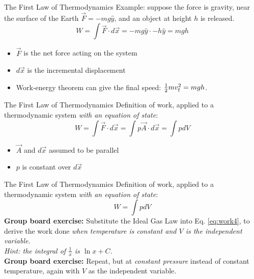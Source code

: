 \documentclass{beamer}
\begin{document}
\begin{frame}{The First Law of Thermodynamics}
Example: suppose the force is gravity, near the surface of the Earth $\vec{F} = -mg \hat{y}$, and an object at height $h$ is released.
\begin{equation}
W = \int \vec{F} \cdot d\vec{x} = -mg \hat{y} \cdot -h\hat{y} = mgh
\label{eq:work2}
\end{equation}
\begin{itemize}
\item $\vec{F}$ is the net force acting on the system
\item $d\vec{x}$ is the incremental displacement
\item Work-energy theorem can give the final speed: $\frac{1}{2}mv_{\rm f}^2 = mgh$.
\end{itemize}
\end{frame}

\begin{frame}{The First Law of Thermodynamics}
Definition of work, applied to a thermodynamic system \textit{with an equation of state}:
\begin{equation}
W = \int \vec{F} \cdot d\vec{x} = \int p\vec{A} \cdot d\vec{x} = \int p dV
\label{eq:work3}
\end{equation}
\begin{itemize}
\item $\vec{A}$ and $d\vec{x}$ assumed to be parallel
\item $p$ is constant over $d\vec{x}$
\end{itemize}
\end{frame}

\begin{frame}{The First Law of Thermodynamics}
Definition of work, applied to a thermodynamic system \textit{with an equation of state}:
\begin{equation}
W = \int p dV
\label{eq:work4}
\end{equation}
\textbf{Group board exercise:} Substitute the Ideal Gas Law into Eq. \ref{eq:work4}, to derive the work done \textit{when temperature is constant and $V$ is the independent variable}. \\ \vspace{0.5cm}
\textit{Hint: the integral of $\frac{1}{x}$ is $\ln x + C$.} \\
\vspace{0.5cm}
\textbf{Group board exercise:} Repeat, but at \textit{constant pressure} instead of constant temperature, again with $V$ as the independent variable.
\end{frame}
\end{document}
